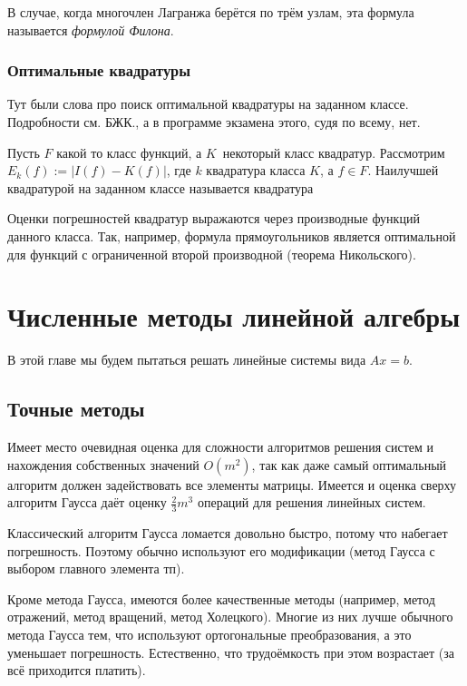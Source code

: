 \documentclass[a4paper]{article}
\DeclareMathOperator{\argmin}{argmin}
\begin{document}
\begin{df}
В случае, когда многочлен Лагранжа берётся по трём узлам, эта формула
называется \emph{формулой Филона}.
\end{df}

\subsubsection{Оптимальные квадратуры}

Тут были слова про поиск оптимальной квадратуры на заданном классе.
Подробности см. БЖК., а в программе экзамена этого, судя по всему,
нет.


Пусть $F$ какой то класс функций, а $K$\ некоторый класс
квадратур. Рассмотрим $E_k(f) := |I(f)-K(f)|$, где $k$ квадратура
класса $K$, а $f \in F$. Наилучшей квадратурой на заданном классе
называется квадратура \eqn{k^* := \argmin \infl{k\in K} \supl{f\in F}
  E_k(f).}

Оценки погрешностей квадратур выражаются через производные функций
данного класса.  Так, например, формула прямоугольников является
оптимальной для функций с ограниченной второй производной (теорема
Никольского).



\section{Численные методы линейной алгебры}

В этой главе мы будем пытаться решать линейные системы вида $Ax= b$.


\subsection{Точные методы}

Имеет место очевидная оценка для сложности алгоритмов решения систем и
нахождения собственных значений $O(m^2)$, так как даже самый
оптимальный алгоритм должен задействовать все элементы матрицы.
Имеется и оценка сверху алгоритм Гаусса даёт оценку $\frac23 m^3$
операций для решения линейных систем.

Классический алгоритм Гаусса ломается довольно быстро, потому что
набегает погрешность.  Поэтому обычно используют его модификации
(метод Гаусса с выбором главного элемента тп).

Кроме метода Гаусса, имеются более качественные методы (например,
метод отражений, метод вращений, метод Холецкого).  Многие из них
лучше обычного метода Гаусса тем, что используют ортогональные
преобразования, а это уменьшает погрешность.  Естественно, что
трудоёмкость при этом возрастает (за всё приходится платить).
\end{document}
